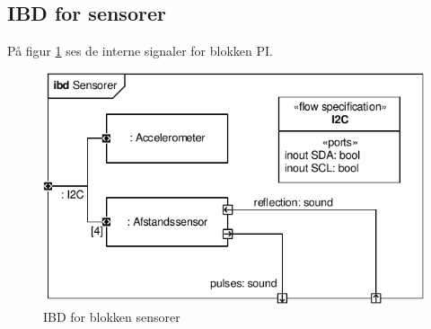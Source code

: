 \subsection{IBD for sensorer}

På figur \ref{fig:ibd_sensorer} ses de interne signaler for blokken PI.

\begin{figure}[h]
\centering
\includegraphics[scale=1]{../fig/diagrammer/bil/ibd_sensorer.pdf}
\caption{IBD for blokken sensorer}
\label{fig:ibd_sensorer}
\end{figure}